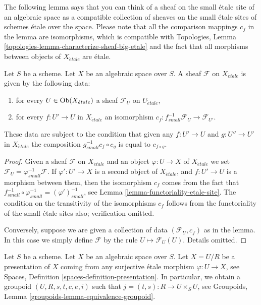 \noindent
The following lemma says that you can think of a sheaf on the small
\'etale site of an algebraic space as a compatible collection of sheaves
on the small \'etale sites of schemes \'etale over the space. Please note
that all the comparison mappings $c_f$ in the lemma are isomorphisms,
which is compatible with
Topologies, Lemma \ref{topologies-lemma-characterize-sheaf-big-etale}
and the fact that all morphisms between objects of $X_{\acute{e}tale}$
are \'etale.

\begin{lemma}
\label{lemma-characterize-sheaf-small-etale}
Let $S$ be a scheme. Let $X$ be an algebraic space over $S$.
A sheaf $\mathcal{F}$ on $X_{\acute{e}tale}$ is given by the following data:
\begin{enumerate}
\item for every $U \in \mathop{\rm Ob}\nolimits(X_{\acute{e}tale})$ a sheaf
$\mathcal{F}_U$ on $U_{\acute{e}tale}$,
\item for every $f : U' \to U$ in $X_{\acute{e}tale}$ an isomorphism
$c_f : f_{small}^{-1}\mathcal{F}_U \to \mathcal{F}_{U'}$.
\end{enumerate}
These data are subject to the condition that given any $f : U' \to U$
and $g : U'' \to U'$ in $X_{\acute{e}tale}$ the composition
$g_{small}^{-1}c_f \circ c_g$ is equal to $c_{f \circ g}$.
\end{lemma}

\begin{proof}
Given a sheaf $\mathcal{F}$ on $X_{\acute{e}tale}$ and an object
$\varphi : U \to X$ of
$X_{\acute{e}tale}$ we set $\mathcal{F}_U = \varphi_{small}^{-1}\mathcal{F}$.
If $\varphi' : U' \to X$ is a second object of $X_{\acute{e}tale}$, and
$f : U' \to U$ is a morphism between them, then
the isomorphism $c_f$ comes from the fact that
$f_{small}^{-1} \circ \varphi_{small}^{-1} = (\varphi')^{-1}_{small}$, see
Lemma \ref{lemma-functoriality-etale-site}. The condition on the
transitivity of the isomorphisms $c_f$ follows from the functoriality
of the small \'etale sites also; verification omitted.

\medskip\noindent
Conversely, suppose we are given a collection of data $(\mathcal{F}_U, c_f)$
as in the lemma. In this case we simply define $\mathcal{F}$ by the rule
$U \mapsto \mathcal{F}_U(U)$. Details omitted.
\end{proof}

\noindent
Let $S$ be a scheme. Let $X$ be an algebraic space over $S$.
Let $X = U/R$ be a presentation of $X$ coming from any surjective
\'etale morphism $\varphi : U \to X$, see
Spaces, Definition \ref{spaces-definition-presentation}.
In particular, we obtain a groupoid $(U, R, s, t, c, e, i)$ such that
$j = (t, s) : R \to U \times_S U$, see
Groupoids, Lemma \ref{groupoids-lemma-equivalence-groupoid}.

